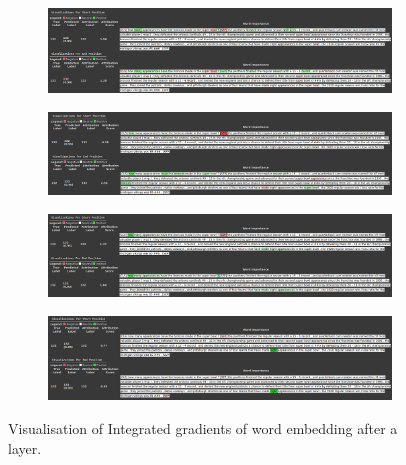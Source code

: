 \documentclass[10pt,twocolumn,letterpaper]{article}
\begin{document}
\begin{figure}
    \centering
    \begin{subfigure}[t]{0.9\columnwidth}
    \centering
    \includegraphics[width=\linewidth]{ll0.png}
    \end{subfigure}
    \begin{subfigure}[t]{0.9\columnwidth}
    \centering
    \includegraphics[width=\linewidth]{ll1.png}
    \end{subfigure}
    \begin{subfigure}[t]{0.9\columnwidth}
    \centering
    \includegraphics[width=\linewidth]{ll5.png}
    \end{subfigure}
    \begin{subfigure}[t]{0.9\columnwidth}
    \centering
    \includegraphics[width=\linewidth]{ll11.png}
    \end{subfigure}
    \caption{Visualisation of Integrated gradients of word embedding after a layer.}
    \label{fig:plot1}
\end{figure}
\twocolumn
\end{document}
